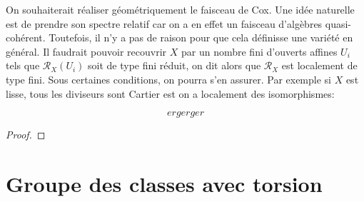 On souhaiterait réaliser géométriquement le faisceau de Cox. Une idée naturelle est de prendre son spectre relatif car on a en effet un faisceau d'algèbres quasi-cohérent. Toutefois, il n'y a pas de raison pour que cela définisse une variété en général. Il faudrait pouvoir recouvrir $X$ par un nombre fini d'ouverts affines $U_i$ tels que $\mathcal{R}_X(U_i)$ soit de type fini réduit, on dit alors que $\mathcal{R}_X$ est localement de type fini. Sous certaines conditions, on pourra s'en assurer. Par exemple si $X$ est lisse, tous les diviseurs sont Cartier est on a localement des isomorphismes:

$$ergerger$$

\begin{prop}

\end{prop}
\begin{proof}

\end{proof}

\section{Groupe des classes avec torsion}
